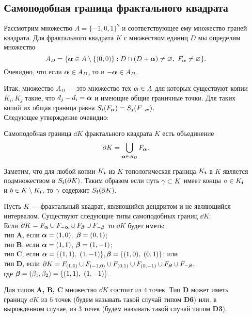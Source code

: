 \subsection{Самоподобная граница фрактального квадрата}

Рассмотрим множество $A=\{-1,0,1\}^2$ и соответствующее ему множество граней квадрата. 
Для фрактального квадрата $K$ с множеством единиц $D$ мы определим множество 
$$A_D=\{{\bm{\alpha}}\in A\setminus\{(0,0)\}: D\cap(D+{\bm{\alpha}})\neq\varnothing,\ F_{\bm{\alpha}}\neq\varnothing\}.$$ 
Очевидно, что если ${\bm{\alpha}}\in A_D$, то и $-{\bm{\alpha}}\in A_D$.

Итак, множество $A_D$ --- это множество тех ${\bm{\alpha}}\in A$ для которых существуют копии $K_i, K_j$ такие, что $d_j-d_i={\bm{\alpha}}$ и имеющие общие граничные точки. 
Для таких копий их общая граница равна $S_i(F_{\bm{\alpha}})=S_j(F_{-{\bm{\alpha}}})$.\\

Следующее утверждение очевидно:

\begin{proposition}\label{prop:dd}
Самоподобная граница $\dd K$ фрактального квадрата $K$ есть объединение
\begin{equation}
 \partial K=\bigcup\limits_{{\bm{\alpha}}\in A_D}F_{\bm{\alpha}}.
\end{equation}
\end{proposition}

Заметим, что для любой копии $K_{\bm{i}}$ из $K$ топологическая граница $K_{\bm{i}}$ в $K$ является подмножеством в 
$S_{\bm{i}}(\partial K)$. 
Таким образом если путь $\gamma\subset K$ имеет концы $a\in K_{\bm{i}}$ и $b\in K\setminus K_{\bm{i}}$, то $\gamma$ содержит $S_{\bm{i}}(\partial K)$.

\begin{theorem}\label{ssboundary}
Пусть $K$ --- фрактальный квадрат, являющийся дендритом и не являющийся интервалом. 
Существуют следующие типы самоподобных границ $\dd K$:\\
Если $\partial K=F_{\bm{\alpha}}\cup F_{-{\bm{\alpha}}}\cup F_{\bm{\beta}}\cup F_{-{\bm{\beta}}}$ то $\dd K$ будет иметь:\\
тип {\bf A}, если ${\bm{\alpha}}=(1,0)$, $ {\bm{\beta}}=(0,1)$;\\ 
тип {\bf B}, если ${\bm{\alpha}}=(1,1)$, $ {\bm{\beta}}=(1,-1)$; \\
тип {\bf C}, если $\bma=\{(1,1),\ (1,-1)\},\bmb=\{(1,0),\ (0,1)\}$; или\\
тип {\bf D}, если $\partial K=F_{(1,0)}\cup F_{(-1,0)}\cup F_{(0,1)}\cup F_{(0,-1)}\cup F_{\bm{\beta}}\cup F_{-{\bm{\beta}}}$,\\ 
где $\bmb=(\be_1,\be_2)=\{(1,1),\ (1,-1)\}$.
 
Для типов {\bf A, B, C} множество $\dd K$ состоит из $4$ точек. 
Тип {\bf D} может иметь границу $\dd K$ из $6$ точек (будем называть такой случай типом {\bf D6}) или, в вырожденном случае, из $3$ точек (будем называть такой случай типом {\bf D3}).
\end{theorem}

